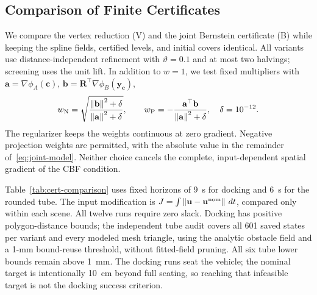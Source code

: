 \documentclass[journal]{IEEEtran}
\theoremstyle{definition}
\newcommand{\norm}[1]{\left\lVert #1\right\rVert}
\newcommand{\Rot}{\mathbf{R}}
\begin{document}
\subsection{Comparison of Finite Certificates}\label{sec:cert-comparison}
We compare the vertex reduction (V) and the joint Bernstein certificate (B) while keeping
the spline fields, certified levels, and initial covers identical. All variants use
distance-independent refinement with $\vartheta=0.1$ and at most two halvings; screening
uses the unit lift. In addition to $w=1$, we test fixed multipliers with
$\mathbf a=\nabla\phi_A(\mathbf c)$, $\mathbf b=\Rot^\top\nabla\phi_B(\mathbf y_{\mathbf c})$,
\begin{equation}
w_{\rm N}=\sqrt{\frac{\norm{\mathbf b}^2+\delta}{\norm{\mathbf a}^2+\delta}},\qquad
w_{\rm P}=-\frac{\mathbf a^\top\mathbf b}{\norm{\mathbf a}^2+\delta},\quad\delta=10^{-12}.
\end{equation}
The regularizer keeps the weights continuous at zero gradient. Negative projection weights
are permitted, with the absolute value in the remainder of~\eqref{eq:joint-model}.
Neither choice cancels the complete, input-dependent spatial gradient of the CBF condition.

Table~\ref{tab:cert-comparison} uses fixed horizons of 9~s for docking and 6~s for the rounded
tube. The input modification is $J=\int\norm{\mathbf u-\mathbf u^{\rm nom}}\,dt$, compared
only within each scene. All twelve runs require zero slack. Docking has positive polygon-distance
bounds; the independent tube audit covers all 601 saved states per variant and every modeled mesh
triangle, using the analytic obstacle field and a 1-mm bound-reuse threshold, without fitted-field
pruning. All six tube lower bounds remain above 1~mm. The docking runs seat the vehicle; the nominal target is intentionally
10~cm beyond full seating, so reaching that infeasible target is not the docking success criterion.
\end{document}

